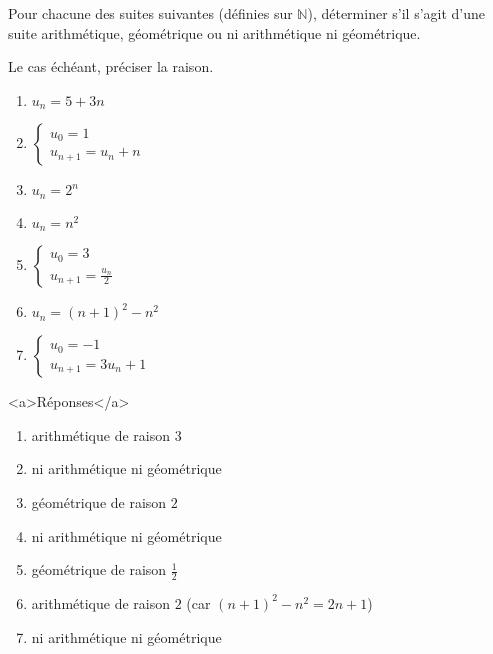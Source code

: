 
%
Pour chacune des suites suivantes (définies sur $\mathbb{N}$), déterminer s'il s'agit d'une suite arithmétique, géométrique ou ni arithmétique ni géométrique.
\par
Le cas échéant, préciser la raison.
\begin{enumerate}
     \item
     $u_{n}=5+3n$
     \item
     $\left\{ \begin{matrix} u_{0}=1 \\ u_{n+1} = u_{n}+n\end{matrix}\right.$
          \item
          $u_{n}=2^{n}$
          \item
          $u_{n}=n^{2}$
          \item
          $\left\{ \begin{matrix} u_{0}=3 \\ u_{n+1} = \frac{u_{n}}{2}\end{matrix}\right.$
               \item
               $u_{n}=\left(n+1\right)^{2}-n^{2}$
               \item
               $\left\{ \begin{matrix} u_{0}=-1 \\ u_{n+1}=3u_{n}+1 \end{matrix}\right.$
               \end{enumerate}
               \begin{corrige}
                    \begin{h2}<a>Réponses</a>\end{h2}
                    \begin{enumerate}
                         \item
                         arithmétique de raison $3$
                         \item
                         ni arithmétique ni géométrique
                         \item
                         géométrique de raison $2$
                         \item
                         ni arithmétique ni géométrique
                         \item
                         géométrique de raison $\frac{1}{2}$
                         \item
                         arithmétique de raison $2$ (car $\left(n+1\right)^{2}-n^{2}=2n+1$)
                         \item
                         ni arithmétique ni géométrique
                    \end{enumerate}
               \end{corrige}
